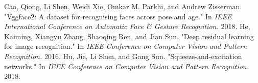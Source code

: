 \begin{thebibliography}{widest entry}
  Cao, Qiong, Li Shen, Weidi Xie, Omkar M. Parkhi, and Andrew Zisserman. "Vggface2: A dataset for recognising faces across pose and age." In \textit{IEEE International Conference on Automatic Face & Gesture Recognition.} 2018.
   He, Kaiming, Xiangyu Zhang, Shaoqing Ren, and Jian Sun. "Deep residual learning for image recognition." In \textit{IEEE Conference on Computer Vision and Pattern Recognition.} 2016.
  Hu, Jie, Li Shen, and Gang Sun. "Squeeze-and-excitation networks." In \textit{IEEE Conference on Computer Vision and Pattern Recognition.} 2018.
\end{thebibliography}